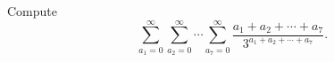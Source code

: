 Compute \[\sum_{a_1=0}^\infty\sum_{a_2=0}^\infty\cdots\sum_{a_7=0}^\infty\dfrac{a_1+a_2+\cdots+a_7}{3^{a_1+a_2+\cdots+a_7}}.\]
